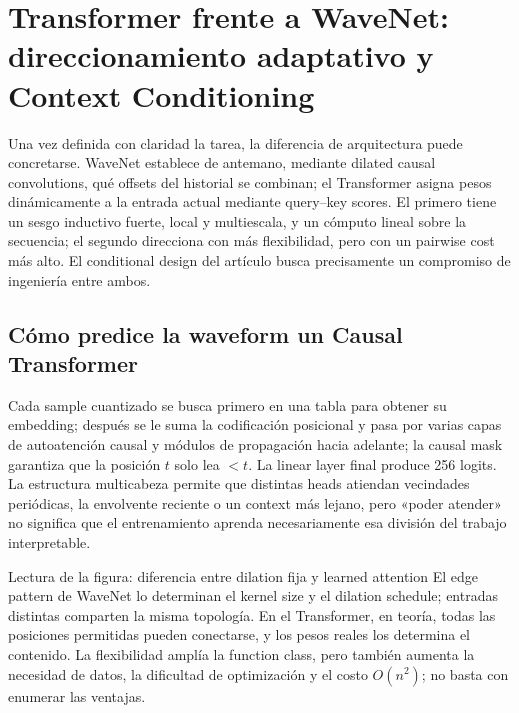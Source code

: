\section{Transformer frente a WaveNet: direccionamiento adaptativo y Context Conditioning}

Una vez definida con claridad la tarea, la diferencia de arquitectura puede concretarse. WaveNet establece de antemano, mediante dilated causal convolutions, qué offsets del historial se combinan; el Transformer asigna pesos dinámicamente a la entrada actual mediante query--key scores. El primero tiene un sesgo inductivo fuerte, local y multiescala, y un cómputo lineal sobre la secuencia; el segundo direcciona con más flexibilidad, pero con un pairwise cost más alto. El conditional design del artículo busca precisamente un compromiso de ingeniería entre ambos.

\subsection{Cómo predice la waveform un Causal Transformer}

Cada sample cuantizado se busca primero en una tabla para obtener su embedding; después se le suma la codificación posicional y pasa por varias capas de autoatención causal y módulos de propagación hacia adelante; la causal mask garantiza que la posición $t$ solo lea $<t$. La linear layer final produce 256 logits. La estructura multicabeza permite que distintas heads atiendan vecindades periódicas, la envolvente reciente o un context más lejano, pero «poder atender» no significa que el entrenamiento aprenda necesariamente esa división del trabajo interpretable.


\begin{knowledgebox}{Lectura de la figura: diferencia entre dilation fija y learned attention}
El edge pattern de WaveNet lo determinan el kernel size y el dilation schedule; entradas distintas comparten la misma topología. En el Transformer, en teoría, todas las posiciones permitidas pueden conectarse, y los pesos reales los determina el contenido. La flexibilidad amplía la function class, pero también aumenta la necesidad de datos, la dificultad de optimización y el costo $O(n^2)$; no basta con enumerar las ventajas.
\end{knowledgebox}

